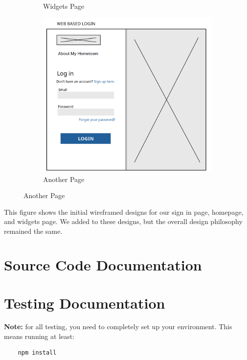 \documentclass[12pt]{article}
\begin{document}
\begin{figure}[htbp]
\begin{subfigure}[b]{0.48\textwidth}
        \caption{Widgets Page}
    \end{subfigure}
    \centering
    \begin{subfigure}[b]{0.48\textwidth}
        \centering
        \includegraphics[width=\textwidth]{images/sign_in_page.png}
        \caption{Another Page}
    \end{subfigure}
\end{figure}

This figure shows the initial wireframed designs for our sign in page, homepage, and widgets page. We added to these designs, but the overall design philosophy remained the same.

\newpage

\section{Source Code Documentation}

\newpage

\section{Testing Documentation}

\textbf{Note:} for all testing, you need to completely set up your environment. This means running at least:
\begin{verbatim}
    npm install
\end{verbatim}
\end{document}
